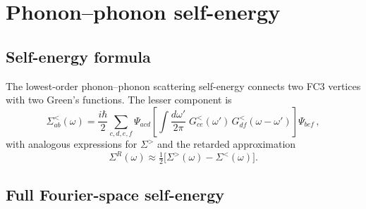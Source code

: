 \documentclass[11pt]{article}
\begin{document}
\section{Phonon--phonon self-energy}
\label{sec:self_energy}

\subsection{Self-energy formula}
\label{sec:se_formula}

The lowest-order phonon--phonon scattering self-energy connects two FC3
vertices with two Green's functions.  The lesser component is
\begin{equation}\label{eq:sigma_guo}
  \Sigma^{<}_{ab}(\omega)
  = \frac{i\hbar}{2}
    \sum_{c,d,e,f}
    \Psi_{acd}
    \left[
      \int \frac{d\omega'}{2\pi}\;
      G^<_{ce}(\omega')\,
      G^<_{df}(\omega-\omega')
    \right]
    \Psi_{bef}\,,
\end{equation}
with analogous expressions for $\Sigma^{>}$ and the retarded
approximation
\begin{equation}\label{eq:sigma_r}
  \Sigma^R(\omega) \approx \tfrac{1}{2}
  \bigl[\Sigma^>(\omega) - \Sigma^<(\omega)\bigr].
\end{equation}

\subsection{Full Fourier-space self-energy}
\label{sec:fourier_se}
\end{document}
